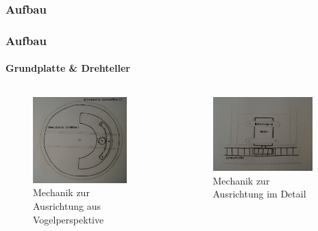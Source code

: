 \subsubsection{Aufbau}
\begin{frame}
	\frametitle{Aufbau\hfill{}\footnotesize \group}
	\framesubtitle{Grundplatte \& Drehteller}
	\begin{columns}
		\begin{column}{0.5\textwidth}
				\begin{figure}
					\centering
					\includegraphics[width=0.85\textwidth]{../../fig/Ausrichtvorrichtung_Oben.jpg}
					\caption{Mechanik zur Ausrichtung aus Vogelperspektive}
				\end{figure}
		\end{column}
		\begin{column}{0.5\textwidth}
				\begin{figure}
					\centering
					\includegraphics[width=0.9\textwidth]{../../fig/Ausrichtvorrichtung_Detail.jpg}
					\caption{Mechanik zur Ausrichtung im Detail}
				\end{figure}
		\end{column}
	\end{columns}
\end{frame}

